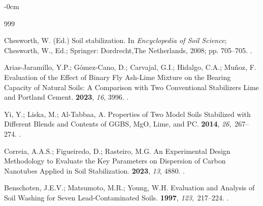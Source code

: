 \documentclass[algorithms,article,accept,pdftex,moreauthors]{Definitions/mdpi}
\begin{document}
\begin{adjustwidth}{-\extralength}{0cm}


\begin{thebibliography}{999}

Chesworth, W. (Ed.) Soil stabilization.
\newblock In {\em Encyclopedia of Soil Science}; Chesworth, W., Ed.; Springer: Dordrecht,The Netherlands,  2008; pp. 705--705.
.

Arias-Jaramillo, Y.P.; Gómez-Cano, D.; Carvajal, G.I.; Hidalgo, C.A.; Muñoz,
  F.
\newblock Evaluation of the Effect of Binary Fly Ash-Lime Mixture on the
  Bearing Capacity of Natural Soils: A Comparison with Two Conventional
  Stabilizers Lime and Portland Cement.
 {\bf 2023}, {\em 16}, 3996.
.

\clearpage 
{}
Yi, Y.; Liska, M.; Al-Tabbaa, A.
\newblock Properties of Two Model Soils Stabilized with Different Blends and
  Contents of GGBS, MgO, Lime, and PC.
 {\bf 2014}, {\em
  26},~267--274.
.

Correia, A.A.S.; Figueiredo, D.; Rasteiro, M.G.
\newblock An Experimental Design Methodology to Evaluate the Key Parameters on
  Dispersion of Carbon Nanotubes Applied in Soil Stabilization.
 {\bf 2023}, {\em 13}, 4880.
.

Benschoten, J.E.V.; Matsumoto, M.R.; Young, W.H.
\newblock Evaluation and Analysis of Soil Washing for Seven Lead-Contaminated
  Soils.
 {\bf 1997}, {\em
  123},~217--224.
.


\end{thebibliography}
\end{adjustwidth}
\end{document}
